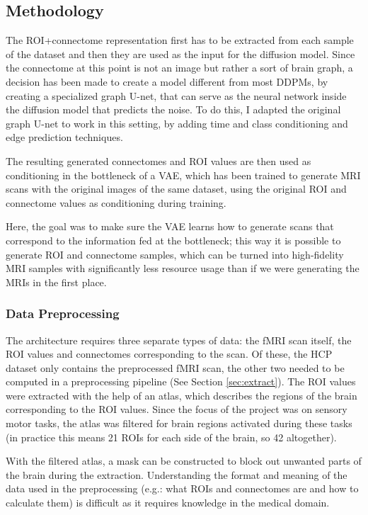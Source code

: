 	\subsection{Methodology}
	
	The ROI+connectome representation first has to be extracted from each sample of the dataset and then they are used as the input for the diffusion model. Since the connectome at this point is not an image but rather a sort of brain graph, a decision has been made to create a model different from most DDPMs, by creating a specialized graph U-net, that can serve as the neural network inside the diffusion model that predicts the noise. To do this, I adapted the original graph U-net \cite{graph-u-net} to work in this setting, by adding time and class conditioning and edge prediction techniques.
	
	The resulting generated connectomes and ROI values are then used as conditioning in the bottleneck of a VAE, which has been trained to generate MRI scans with the original images of the same dataset, using the original ROI and connectome values as conditioning during training. 
	
	Here, the goal was to make sure the VAE learns how to generate scans that correspond to the information fed at the bottleneck; this way it is possible to generate ROI and connectome samples, which can be turned into high-fidelity MRI samples with significantly less resource usage than if we were generating the MRIs in the first place.
	
	\subsubsection{Data Preprocessing}
	
	The architecture requires three separate types of data: the fMRI scan itself, the ROI values and connectomes corresponding to the scan. Of these, the HCP dataset only contains the preprocessed fMRI scan, the other two needed to be computed in a preprocessing pipeline (See Section \ref{sec:extract}). The ROI values were extracted with the help of an atlas, which describes the regions of the brain corresponding to the ROI values. Since the focus of the project was on sensory motor tasks, the atlas was filtered for brain regions activated during these tasks (in practice this means 21 ROIs for each side of the brain, so 42 altogether). 
	
	With the filtered atlas, a mask can be constructed to block out unwanted parts of the brain during the extraction. Understanding the format and meaning of the data used in the preprocessing (e.g.: what ROIs and connectomes are and how to calculate them) is difficult as it requires knowledge in the medical domain. 
	
